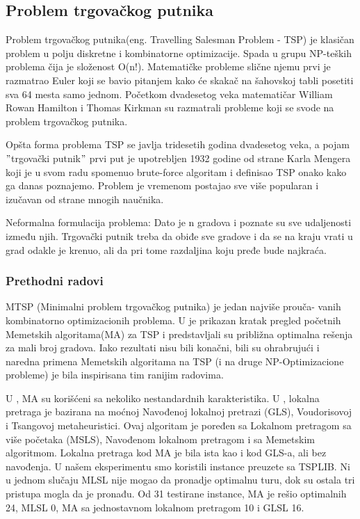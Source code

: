 \documentclass[a4paper]{article}
\begin{document}
\subsection{Problem trgovačkog putnika}
\label{sec:trgovacki_putnik}

Problem trgovačkog putnika(eng. Travelling Salesman Problem - TSP) je klasičan problem u polju diskretne i kombinatorne optimizacije. Spada u grupu NP-teških problema čija je složenost O(n!). Matematičke probleme slične njemu prvi je razmatrao Euler koji se bavio pitanjem kako će skakač na šahovskoj tabli posetiti sva 64 mesta samo jednom. Početkom dvadesetog veka matematičar William Rowan Hamilton i Thomas Kirkman su razmatrali probleme koji se svode na problem trgovačkog putnika. 


Opšta forma problema TSP se javlja tridesetih godina dvadesetog veka, a pojam $"$trgovački putnik$"$ prvi put je upotrebljen 1932 godine od strane Karla Mengera koji je u svom radu spomenuo brute-force algoritam i definisao TSP onako kako ga danas poznajemo. Problem je vremenom postajao sve više popularan i izučavan od strane mnogih naučnika.

Neformalna formulacija problema: Dato je n gradova i poznate su sve udaljenosti između njih. Trgovački putnik treba da obiđe sve gradove i da se na kraju vrati u grad odakle je krenuo, ali da pri tome razdaljina koju pređe bude najkraća.

\subsubsection{Prethodni radovi}
\label{subsec:prethodniRadovi}

MTSP (Minimalni problem trgovačkog putnika) je jedan najviše prouča- vanih kombinatorno optimizacionih problema. 
U \cite{Handbook} je prikazan kratak pregled početnih Memetskih algoritama(MA) za TSP i predstavljali su približna optimalna rešenja za mali broj gradova. Iako rezultati nisu bili konačni, bili su ohrabrujući i naredna primena Memetskih algoritama na TSP (i na druge NP-Optimizacione probleme) je bila inspirisana tim ranijim radovima.


U \cite{Memetic}, MA su korišćeni sa nekoliko nestandardnih karakteristika. U \cite{Memetic}, lokalna pretraga je bazirana na moćnoj Navođenoj lokalnoj pretrazi (GLS), Voudorisovoj i Tsangovoj metaheuristici. Ovaj algoritam je poređen sa Lokalnom pretragom sa više početaka (MSLS), Navođenom lokalnom pretragom i sa Memetskim algoritmom. Lokalna pretraga kod MA je bila ista kao i kod GLS-a, ali bez navođenja. U našem eksperimentu smo koristili instance preuzete sa TSPLIB\cite{TSPLIB}. Ni u jednom slučaju MLSL nije mogao da pronadje optimalnu turu, dok su ostala tri pristupa mogla da je pronađu. Od 31 testirane instance, MA je rešio optimalnih 24, MLSL 0, MA sa jednostavnom lokalnom pretragom 10 i GLSL 16. 
\end{document}
